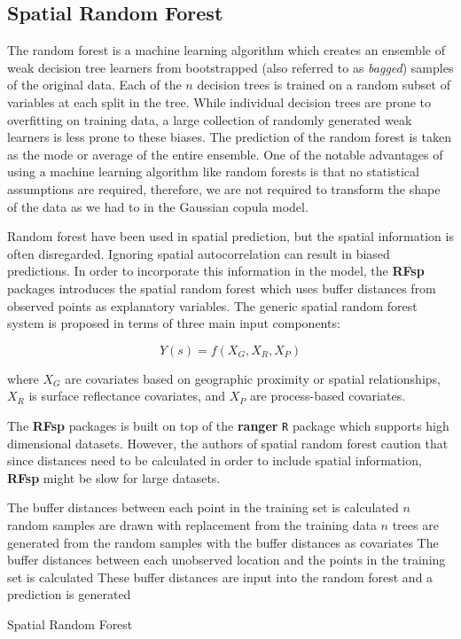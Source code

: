 \documentclass{article}
\begin{document}
\subsection{Spatial Random Forest}
The random forest is a machine learning algorithm which creates an ensemble of weak decision tree learners from bootstrapped (also referred to as \textit{bagged}) samples of the original data\cite{breiman01}.
Each of the $n$ decision trees is trained on a random subset of variables at each split in the tree.
While individual decision trees are prone to overfitting on training data, a large collection of randomly generated weak learners is less prone to these biases.
The prediction of the random forest is taken as the mode or average of the entire ensemble.
One of the notable advantages of using a machine learning algorithm like random forests is that no statistical assumptions are required, therefore, we are not required to transform the shape of the data as we had to in the Gaussian copula model.

Random forest have been used in spatial prediction, but the spatial information is often disregarded\cite{hengl18}.
Ignoring spatial autocorrelation can result in biased predictions.
In order to incorporate this information in the model, the \textbf{RFsp} packages introduces the spatial random forest which uses buffer distances from observed points as explanatory variables.
The generic spatial random forest system is proposed in terms of three main input components:

$$
Y(s) = f(X_G, X_R, X_P)
$$

where $X_G$ are covariates based on geographic proximity or spatial relationships, $X_R$ is surface reflectance covariates, and $X_P$ are process-based covariates.

The \textbf{RFsp} packages is built on top of the \textbf{ranger} \texttt{R} package which supports high dimensional datasets.
However, the authors of spatial random forest caution that since distances need to be calculated in order to include spatial information, \textbf{RFsp} might be slow for large datasets.

\vspace{.5cm}

\begin{algorithm}[H]
\SetAlgoLined
{}
 {
	The buffer distances between each point in the training set is calculated\; 
	$n$ random samples are drawn with replacement from the training data\;
	$n$ trees are generated from the random samples with the buffer distances as covariates\;
	The buffer distances between each unobserved location and the points in the training set is calculated\; 
	These buffer distances are input into the random forest and a prediction is generated\; 
}
	\caption{Spatial Random Forest}
\end{algorithm}
\end{document}
